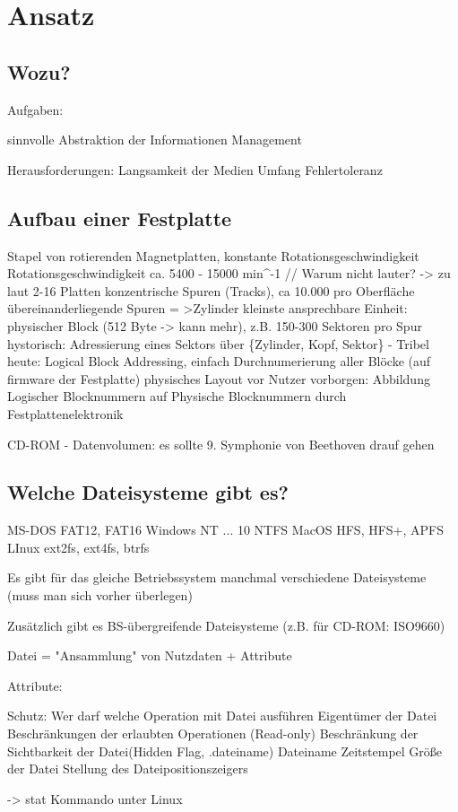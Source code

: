 \documentclass[a4paper, 11pt]{article}
\begin{document}
\tableofcontents

\newpage

\section{Ansatz}
\subsection{Wozu?}
Aufgaben:

sinnvolle Abstraktion der Informationen
Management

Herausforderungen:
Langsamkeit der Medien
Umfang
Fehlertoleranz
\subsection{Aufbau einer Festplatte}
Stapel von rotierenden Magnetplatten, konstante Rotationsgeschwindigkeit
Rotationsgeschwindigkeit ca. 5400 - 15000 min^-1 // Warum nicht lauter? -> zu laut
2-16 Platten
konzentrische Spuren (Tracks), ca 10.000 pro Oberfläche
übereinanderliegende Spuren = >Zylinder
kleinste ansprechbare Einheit: physischer Block (512 Byte -> kann mehr), z.B. 150-300 Sektoren pro Spur
hystorisch: Adressierung eines Sektors über \{Zylinder, Kopf, Sektor\} - Tribel
heute: Logical Block Addressing, einfach Durchnumerierung aller Blöcke (auf firmware der Festplatte)
physisches Layout vor Nutzer vorborgen: Abbildung Logischer Blocknummern auf Physische Blocknummern durch Festplattenelektronik

CD-ROM - Datenvolumen: es sollte 9. Symphonie von Beethoven drauf gehen

\subsection{Welche Dateisysteme gibt es?}
MS-DOS	FAT12, FAT16
Windows NT ... 10	NTFS
MacOS	HFS, HFS+, APFS
LInux	ext2fs, ext4fs, btrfs

Es gibt für das gleiche Betriebssystem manchmal verschiedene Dateisysteme (muss man sich vorher überlegen)

Zusätzlich gibt es BS-übergreifende Dateisysteme (z.B. für CD-ROM: ISO9660)

Datei = "Ansammlung" von Nutzdaten + Attribute

Attribute:

Schutz: Wer darf welche Operation mit Datei ausführen
Eigentümer der Datei
Beschränkungen der erlaubten Operationen (Read-only)
Beschränkung der Sichtbarkeit der Datei(Hidden Flag, .dateiname)
Dateiname
Zeitstempel
Größe der Datei
Stellung des Dateipositionszeigers

-> stat Kommando unter Linux
\end{document}
